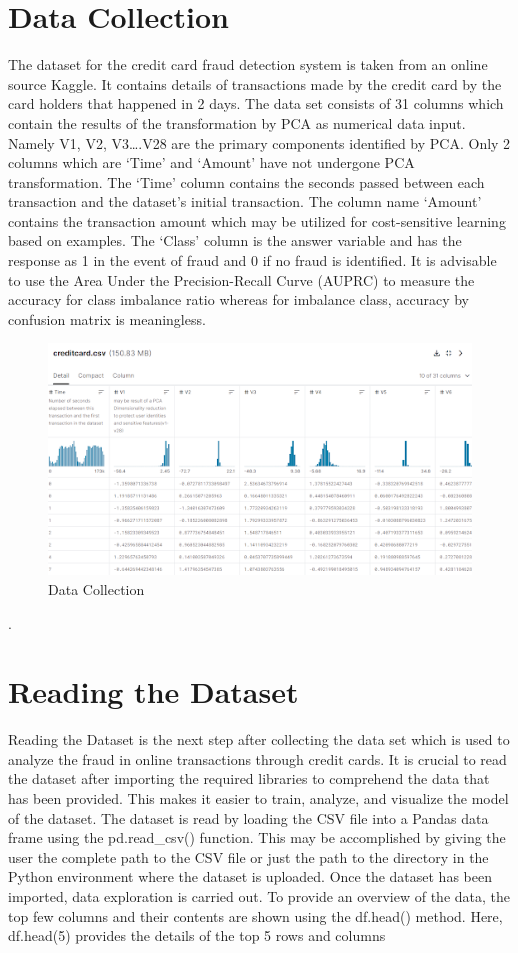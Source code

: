 \section{Data Collection}
The dataset for the credit card fraud detection system is taken from an online source Kaggle. It contains details of transactions made by the credit card by the card holders that happened in 2 days. The data set consists of 31 columns which contain the results of the transformation by PCA as numerical data input. Namely V1, V2, V3….V28 are the primary components identified by PCA. Only 2 columns which are ‘Time’ and ‘Amount’ have not undergone PCA transformation. The ‘Time’ column contains the seconds passed between each transaction and the dataset’s initial transaction. The column name ‘Amount’ contains the transaction amount which may be utilized for cost-sensitive learning based on examples. The ‘Class’ column is the answer variable and has the response as 1 in the event of fraud and 0 if no fraud is identified. It is advisable to use the Area Under the Precision-Recall Curve (AUPRC) to measure the accuracy for class imbalance ratio whereas for imbalance class, accuracy by confusion matrix is meaningless.

\begin{figure}[ht]
    \centering
    \includegraphics[scale=0.8]{figures/Data collection.png}
    \caption{Data Collection}
    \label{fig: Data Collection}
\end{figure}
.\clearpage
\section{Reading the Dataset}
Reading the Dataset is the next step after collecting the data set which is used to analyze the fraud in online transactions through credit cards. It is crucial to read the dataset after importing the required libraries to comprehend the data that has been provided. This makes it easier to train, analyze, and visualize the model of the dataset. The dataset is read by loading the CSV file into a Pandas data frame using the pd.read\_csv() function. This may be accomplished by giving the user the complete path to the CSV file or just the path to the directory in the Python environment where the dataset is uploaded. Once the dataset has been imported, data exploration is carried out. To provide an overview of the data, the top few columns and their contents are shown using the df.head() method. Here, df.head(5) provides the details of the top 5 rows and columns 


